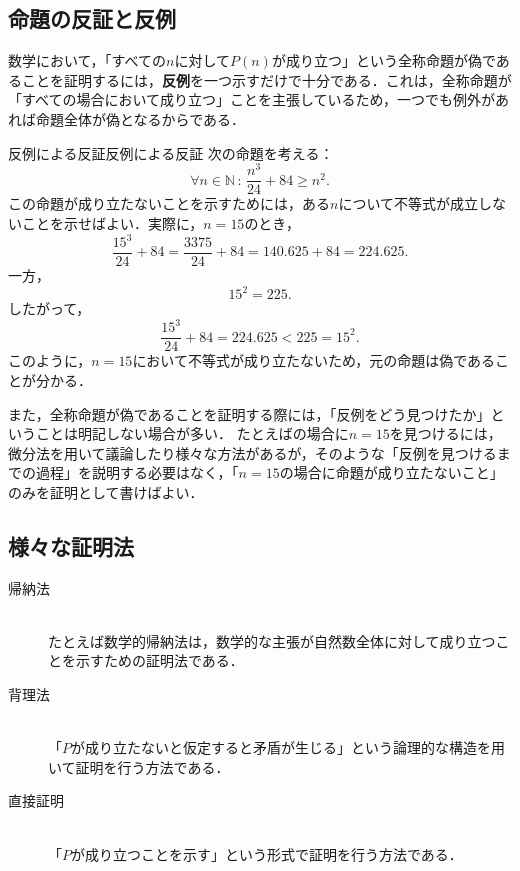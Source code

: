 \subsection{命題の反証と反例}

数学において，「すべての$n$に対して$P(n)$が成り立つ」という全称命題が偽であることを証明するには，\textbf{反例}を一つ示すだけで十分である．これは，全称命題が「すべての場合において成り立つ」ことを主張しているため，一つでも例外があれば命題全体が偽となるからである．

\begin{example}{反例による反証}{反例による反証}
  次の命題を考える：
  \[
    \forall n \in \mathbb{N}\, : \, \frac{n^3}{24} + 84 \geq n^2.
  \]
  この命題が成り立たないことを示すためには，ある$n$について不等式が成立しないことを示せばよい．実際に，$n = 15$のとき，
  \[
    \frac{15^3}{24} + 84 = \frac{3375}{24} + 84 = 140.625 + 84 = 224.625.
  \]
  一方，
  \[
    15^2 = 225.
  \]
  したがって，
  \[
    \frac{15^3}{24} + 84 = 224.625 < 225 = 15^2.
  \]
  このように，$n = 15$において不等式が成り立たないため，元の命題は偽であることが分かる．
\end{example}

また，全称命題が偽であることを証明する際には，「反例をどう見つけたか」ということは明記しない場合が多い．
たとえばの場合に$n=15$を見つけるには，微分法を用いて議論したり様々な方法があるが，そのような「反例を見つけるまでの過程」を説明する必要はなく，「$n=15$の場合に命題が成り立たないこと」のみを証明として書けばよい．

\subsection{様々な証明法}

\begin{description}
  \item[帰納法] \mbox{} \\
        たとえば数学的帰納法は，数学的な主張が自然数全体に対して成り立つことを示すための証明法である．
  \item[背理法] \mbox{} \\
        「$P$が成り立たないと仮定すると矛盾が生じる」という論理的な構造を用いて証明を行う方法である．
  \item[直接証明] \mbox{} \\
        「$P$が成り立つことを示す」という形式で証明を行う方法である．
\end{description}


